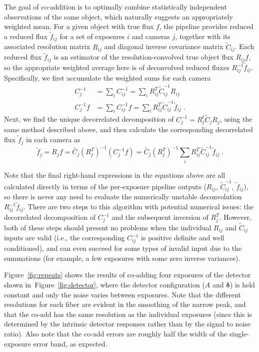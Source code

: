 \documentclass[12pt]{article}
\providecommand{\fig}[1]{Figure~\ref{fig:#1}}
\providecommand{\vecsymbol}[1]{\ensuremath{\boldsymbol{#1}}}
\providecommand{\deltav}{\vecsymbol{\delta}}
\begin{document}
The goal of co-addition is to optimally combine statistically independent observations of the same object, which naturally suggests an appropriately weighted mean. For a given object with true flux $f$, the pipeline provides reduced a reduced flux $\tilde{f}_{ij}$ for a set of exposures $i$ and cameras $j$, together with its associated resolution matrix $R_{ij}$ and diagonal inverse covariance matrix $\tilde{C}_{ij}$. Each reduced flux $\tilde{f}_{ij}$ is an estimator of the resolution-convolved true object flux $R_{ij} f$, so the appropriate weighted average here is of deconvolved reduced fluxes $R_{ij}^{-1} \tilde{f}_{ij}$. Specifically, we first accumulate the weighted sums for each camera
\begin{align}
C_j^{-1} &= \sum_i C_{ij}^{-1} = \sum_i R_{ij}^T \tilde{C}_{ij}^{-1} R_{ij} \\
C_j^{-1}f &= \sum_i C_{ij}^{-1} f = \sum_i R_{ij}^T \tilde{C}_{ij}^{-1} \tilde{f}_{ij} \; .
\end{align}
Next, we find the unique decorrelated decomposition of $C_j^{-1} = R_j^t \tilde{C}_j R_j$, using the same method described above, and then calculate the corresponding decorrelated flux $\tilde{f}_j$ in each camera as
\begin{equation}
\tilde{f}_j = R_j f = \tilde{C_j} (R_j^T)^{-1} \left( C_j^{-1}f \right)
= \tilde{C_j} (R_j^T)^{-1} \sum_i R_{ij}^T \tilde{C}_{ij}^{-1} \tilde{f}_{ij}\; .
\end{equation}

Note that the final right-hand expressions in the equations above are all calculated directly in terms of the per-exposure pipeline outputs ($R_{ij}$, $\tilde{C}_{ij}^{-1}$, $\tilde{f}_{ij}$), so there is never any need to evaluate the numerically unstable deconvolution $R_{ij}^{-1} \tilde{f}_{ij}$. There are two steps to this algorithm with potential numerical issues: the decorrelated decomposition of $C_j^{-1}$ and the subsequent inversion of $R_j^T$. However, both of these steps should present no problems when the individual $R_{ij}$ and $\tilde{C}_{ij}$ inputs are valid (i.e., the corresponding $C_{ij}^{-1}$ is positive definite and well conditioned), and can even succeed for some types of invalid input due to the summations (for example, a few exposures with some zero inverse variances).

\fig{repeats} shows the results of co-adding four exposures of the detector shown in~\fig{detector}, where the detector configuration ($A$ and $\deltav$) is held constant and only the noise varies between exposures. Note that the different resolutions for each fiber are evident in the smoothing of the narrow peak, and that the co-add has the same resolution as the individual exposures (since this is determined by the intrinsic detector responses rather than by the signal to noise ratio). Also note that the co-add errors are roughly half the width of the single-exposure error band, as expected.
\end{document}

